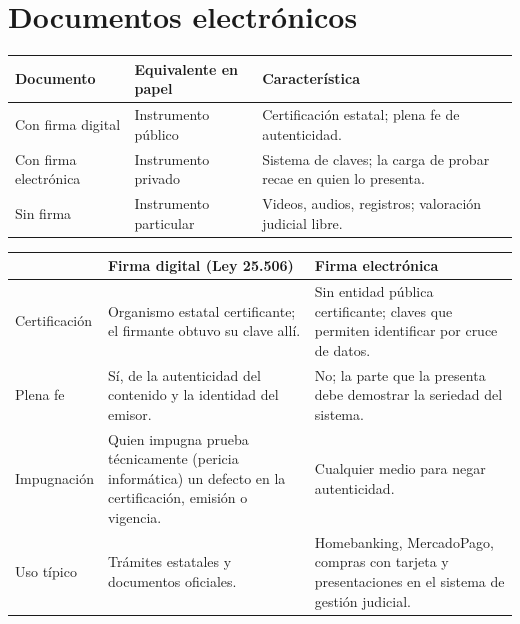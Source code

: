 \documentclass[12pt,oneside]{book}
\renewcommand{\arraystretch}{1.15}
\begin{document}
\section{Documentos electrónicos}

\begin{table}[H]
\centering
\renewcommand{\arraystretch}{1.25}
\begin{tabularx}{\textwidth}{>{\RaggedRight\arraybackslash}p{}>{\RaggedRight\arraybackslash}p{}>{\RaggedRight\arraybackslash}X}
\toprule
\textbf{Documento} & \textbf{Equivalente en papel} & \textbf{Característica} \\
\midrule
Con firma digital & Instrumento público & Certificación estatal; plena fe de autenticidad. \\
Con firma electrónica & Instrumento privado & Sistema de claves; la carga de probar recae en quien lo presenta. \\
Sin firma & Instrumento particular & Videos, audios, registros; valoración judicial libre. \\
\bottomrule
\end{tabularx}
\end{table}

\begin{table}[H]
\centering
\renewcommand{\arraystretch}{1.25}
\begin{tabularx}{\textwidth}{>{\RaggedRight\arraybackslash}p{}>{\RaggedRight\arraybackslash}X>{\RaggedRight\arraybackslash}X}
\toprule
 & \textbf{Firma digital (Ley 25.506)} & \textbf{Firma electrónica} \\
\midrule
Certificación & Organismo estatal certificante; el firmante obtuvo su clave allí. & Sin entidad pública certificante; claves que permiten identificar por cruce de datos. \\
Plena fe & Sí, de la autenticidad del contenido y la identidad del emisor. & No; la parte que la presenta debe demostrar la seriedad del sistema. \\
Impugnación & Quien impugna prueba técnicamente (pericia informática) un defecto en la certificación, emisión o vigencia. & Cualquier medio para negar autenticidad. \\
Uso típico & Trámites estatales y documentos oficiales. & Homebanking, MercadoPago, compras con tarjeta y presentaciones en el sistema de gestión judicial. \\
\bottomrule
\end{tabularx}
\end{table}
\end{document}
